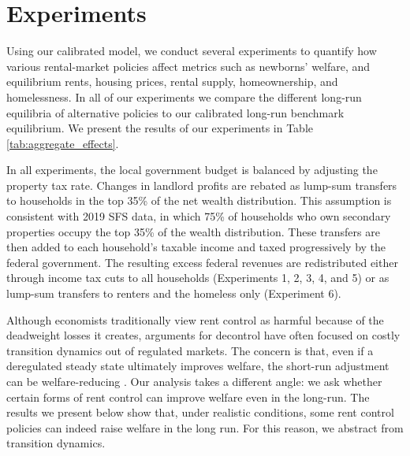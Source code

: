 \documentclass[parskip=full]{article}
\begin{document}
\section{Experiments}\label{section:experiments}

Using our calibrated model, we conduct several experiments to quantify how various rental-market policies affect metrics such as newborns' welfare, and equilibrium rents, housing prices, rental supply, homeownership, and homelessness. In all of our experiments we compare the different long-run equilibria of alternative policies to our calibrated long-run benchmark equilibrium. We present the results of our experiments in Table \ref{tab:aggregate_effects}.

In all experiments, the local government budget is balanced by adjusting the property tax rate. Changes in landlord profits are rebated as lump-sum transfers to households in the top 35\% of the net wealth distribution. This assumption is consistent with 2019 SFS data, in which 75\% of households who own secondary properties occupy the top 35\% of the wealth distribution. These transfers are then added to each household's taxable income and taxed progressively by the federal government. The resulting excess federal revenues are redistributed either through income tax cuts to all households (Experiments 1, 2, 3, 4, and 5) or as lump-sum transfers to renters and the homeless only (Experiment 6).

Although economists traditionally view rent control as harmful because of the deadweight losses it creates, arguments for decontrol have often focused on costly transition dynamics out of regulated markets. The concern is that, even if a deregulated steady state ultimately improves welfare, the short-run adjustment can be welfare-reducing \citep{fmn-2023}. Our analysis takes a different angle: we ask whether certain forms of rent control can improve welfare even in the long-run. The results we present below show that, under realistic conditions, some rent control policies can indeed raise welfare in the long run. For this reason, we abstract from transition dynamics.
\end{document}
